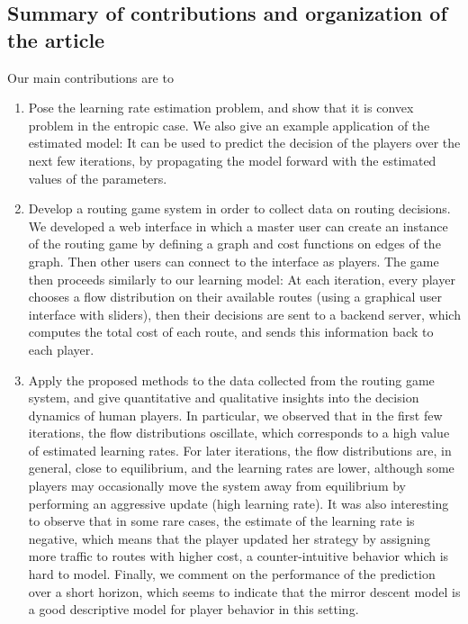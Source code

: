 \documentclass{sig-alternate-ipsn13}
\begin{document}
\subsection{Summary of contributions and organization of the article}
Our main contributions are to
\begin{enumerate}
\item Pose the learning rate estimation problem, and show that it is convex problem in the entropic case. We also give an example application of the estimated model: It can be used to predict the decision of the players over the next few iterations, by propagating the model forward with the estimated values of the parameters.
\item Develop a routing game system in order to collect data on routing decisions. We developed a web interface in which a master user can create an instance of the routing game by defining a graph and cost functions on edges of the graph. Then other users can connect to the interface as players. The game then proceeds similarly to our learning model: At each iteration, every player chooses a flow distribution on their available routes (using a graphical user interface with sliders), then their decisions are sent to a backend server, which computes the total cost of each route, and sends this information back to each player.
\item Apply the proposed methods to the data collected from the routing game system, and give quantitative and qualitative insights into the decision dynamics of human players. In particular, we observed that in the first few iterations, the flow distributions oscillate, which corresponds to a high value of estimated learning rates. For later iterations, the flow distributions are, in general, close to equilibrium, and the learning rates are lower, although some players may occasionally move the system away from equilibrium by performing an aggressive update (high learning rate). It was also interesting to observe that in some rare cases, the estimate of the learning rate is negative, which means that the player updated her strategy by assigning more traffic to routes with higher cost, a counter-intuitive behavior which is hard to model. Finally, we comment on the performance of the prediction over a short horizon, which seems to indicate that the mirror descent model is a good descriptive model for player behavior in this setting.
\end{enumerate}
\end{document}
